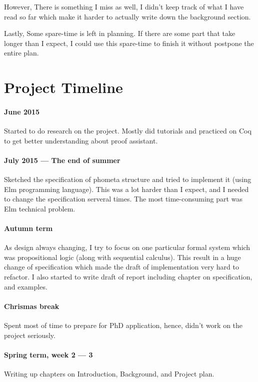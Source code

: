 \documentclass[master.tex]{subfiles}
\begin{document}
However, There is something I miss as well, I didn't keep track of what I have read so far which make it harder to actually write down the background section.

Lastly, Some spare-time is left in planning. If there are some part that take longer than I expect, I could use this spare-time to finish it without postpone the entire plan.

\section{Project Timeline}

\paragraph{June 2015} Started to do research on the project. Mostly did tutorials and practiced on Coq to get better understanding about proof assistant.

\paragraph{July 2015 --- The end of summer} Sketched the specification of phometa structure and tried to implement it (using Elm programming language).
This was a lot harder than I expect, and I needed to change the specification serveral times. The most time-consuming part was Elm technical problem.

\paragraph{Autumn term} As design always changing, I try to focus on one particular formal system which was propositional logic (along with sequential calculus). This result in a huge change of specification which made the draft of implementation very hard to refactor. I also started to write draft of report including chapter on specification, and examples.

\paragraph{Chrismas break} Spent most of time to prepare for PhD application, hence, didn't work on the project seriously.

\paragraph{Spring term, week 2 --- 3} Writing up chapters on Introduction, Background, and Project plan.
\end{document}
